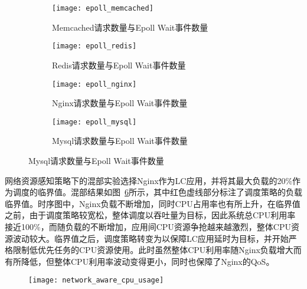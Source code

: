 \begin{figure}[!htbp]
    \centering
    \begin{subfigure}[b]{0.45\textwidth}
        \texttt{[image: epoll\_memcached]}
        \caption{Memcached请求数量与Epoll Wait事件数量}
        \label{fig:epoll_memcached}
    \end{subfigure}
    \begin{subfigure}[b]{0.45\textwidth}
        \texttt{[image: epoll\_redis]}
        \caption{Redis请求数量与Epoll Wait事件数量}
        \label{fig:epoll_redis}
    \end{subfigure}
    \begin{subfigure}[b]{0.45\textwidth}
        \texttt{[image: epoll\_nginx]}
        \caption{Nginx请求数量与Epoll Wait事件数量}
        \label{fig:epoll_nginx}
    \end{subfigure}
    \begin{subfigure}[b]{0.45\textwidth}
        \texttt{[image: epoll\_mysql]}
        \caption{Mysql请求数量与Epoll Wait事件数量}
        \label{fig:epoll_mysql}
    \end{subfigure}
\label{fig:epoll_request}
\end{figure}

网络资源感知策略下的混部实验选择Nginx作为LC应用，并将其最大负载的20\%作为调度的临界值。混部结果如图~\ref{fig:network_aware_cpu_usage}所示，其中红色虚线部分标注了调度策略的负载临界值。时序图中，Nginx负载不断增加，同时CPU占用率也有所上升，在临界值之前，由于调度策略较宽松，整体调度以吞吐量为目标，因此系统总CPU利用率接近100\%，而随负载的不断增加，应用间CPU资源争抢越来越激烈，整体CPU资源波动较大。临界值之后，调度策略转变为以保障LC应用延时为目标，并开始严格限制低优先任务的CPU资源使用。此时虽然整体CPU利用率随Nginx负载增大而有所降低，但整体CPU利用率波动变得更小，同时也保障了Nginx的QoS。

\begin{figure}[H]
    \centering
    \texttt{[image: network\_aware\_cpu\_usage]}
    \label{fig:network_aware_cpu_usage}
\end{figure}


